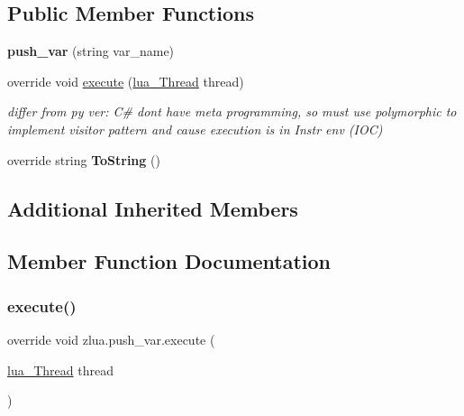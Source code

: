 \subsection*{Public Member Functions}
\begin{DoxyCompactItemize}
\item 
\mbox{\label{classzlua_1_1push__var_ac064959492641889ff53e2eac66e904c}} 
{\bfseries push\+\_\+var} (string var\+\_\+name)
\item 
override void \mbox{\hyperlink{classzlua_1_1push__var_a854bc287123c636f0c3d86735938879f}{execute}} (\mbox{\hyperlink{classzlua_1_1lua___thread}{lua\+\_\+\+Thread}} thread)
\begin{DoxyCompactList}\small\item\em differ from py ver\+: C\# dont have meta programming, so must use polymorphic to implement visitor pattern and cause execution is in Instr env (I\+OC) \end{DoxyCompactList}\item 
\mbox{\label{classzlua_1_1push__var_afae2c8d51a5d2bbcc678103030185766}} 
override string {\bfseries To\+String} ()
\end{DoxyCompactItemize}
\subsection*{Additional Inherited Members}


\subsection{Member Function Documentation}
\mbox{\label{classzlua_1_1push__var_a854bc287123c636f0c3d86735938879f}} 
\subsubsection{\texorpdfstring{execute()}{execute()}}
{\footnotesize\ttfamily override void zlua.\+push\+\_\+var.\+execute (\begin{DoxyParamCaption}\item[{\mbox{\hyperlink{classzlua_1_1lua___thread}{lua\+\_\+\+Thread}}}]{thread }\end{DoxyParamCaption})\hspace{0.3cm}{\ttfamily [virtual]}}




